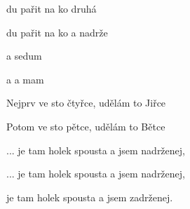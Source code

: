 

\zr
	 du pařit na ko
	   druhá 
	
	 du pařit na ko
	  a  nadrže
\kr

\zs
	  a  sedum 

	a   a  mam 
\ks

\zr \kr
	
\zs	
	Nejprv ve sto čtyřce, udělám to Jiřce

	Potom ve sto pětce, udělám to Bětce
\ks

\zr

	...	je tam holek spousta a jsem nadrženej,

	...	je tam holek spousta a jsem nadrženej,

	je tam holek spousta a jsem zadrženej.
\kr

\kp
